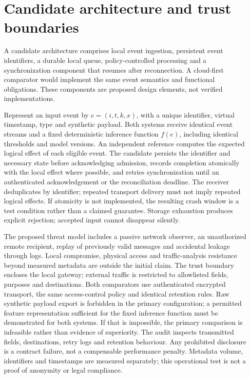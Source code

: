 \documentclass[11pt,a4paper]{article}
\begin{document}
\section{Candidate architecture and trust boundaries}
A candidate architecture comprises local event ingestion, persistent event identifiers, a durable local queue, policy-controlled processing and a synchronization component that resumes after reconnection. A cloud-first comparator would implement the same event semantics and functional obligations. These components are proposed design elements, not verified implementations.

Represent an input event by \(e=(i,t,k,x)\), with a unique identifier, virtual timestamp, type and synthetic payload. Both systems receive identical event streams and a fixed deterministic inference function \(f(e)\), including identical thresholds and model versions. An independent reference computes the expected logical effect of each eligible event. The candidate persists the identifier and necessary state before acknowledging admission, records completion atomically with the local effect where possible, and retries synchronization until an authenticated acknowledgement or the reconciliation deadline. The receiver deduplicates by identifier; repeated transport delivery must not imply repeated logical effects. If atomicity is not implemented, the resulting crash window is a test condition rather than a claimed guarantee. Storage exhaustion produces explicit rejection; accepted input cannot disappear silently.

The proposed threat model includes a passive network observer, an unauthorized remote recipient, replay of previously valid messages and accidental leakage through logs. Local compromise, physical access and traffic-analysis resistance beyond measured metadata are outside the initial claim. The trust boundary encloses the local gateway; external traffic is restricted to allowlisted fields, purposes and destinations. Both comparators use authenticated encrypted transport, the same access-control policy and identical retention rules. Raw synthetic payload export is forbidden in the primary configuration; a permitted feature representation sufficient for the fixed inference function must be demonstrated for both systems. If that is impossible, the primary comparison is infeasible rather than evidence of superiority. The audit inspects transmitted fields, destinations, retry logs and retention behaviour. Any prohibited disclosure is a contract failure, not a compensable performance penalty. Metadata volume, identifiers and timestamps are measured separately; this operational test is not a proof of anonymity or legal compliance.
\end{document}
